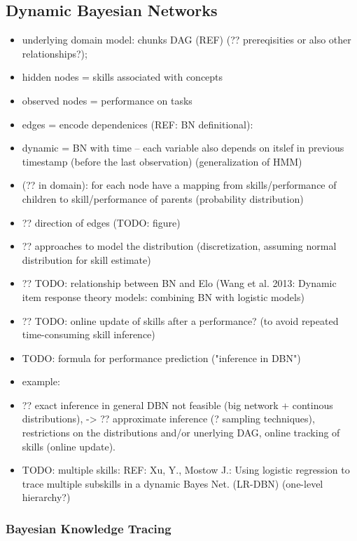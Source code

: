 \subsection{Dynamic Bayesian Networks}

\begin{itemize}
\item underlying domain model: chunks DAG (REF)
  (?? prereqisities or also other relationships?);
\item hidden nodes = skills associated with concepts
\item observed nodes = performance on tasks
\item edges = encode dependenices (REF: BN definitional):
\item dynamic = BN with time -- each variable also depends on itslef in previous timestamp
  (before the last observation) (generalization of HMM)
\item (?? in domain): for each node have a mapping from skills/performance of children
  to skill/performance of parents (probability distribution)
\item ?? direction of edges (TODO: figure)
\item ?? approaches to model the distribution
  (discretization, assuming normal distribution for skill estimate)
\item ?? TODO: relationship between BN and Elo
  (Wang et al. 2013: Dynamic item response theory models: combining BN with logistic models)
\item ?? TODO: online update of skills after a performance?
  (to avoid repeated time-consuming skill inference)
\item TODO: formula for performance prediction ("inference in DBN")
\item example: \cite{its-programming}
\item ?? exact inference in general DBN not feasible (big network + continous distributions),
  -> ?? approximate inference (? sampling techniques),
  restrictions on the distributions and/or unerlying DAG,
  online tracking of skills (online update).
\item TODO: multiple skills: REF: Xu, Y., Mostow J.: Using logistic regression to trace multiple subskills in a dynamic Bayes Net. (LR-DBN) \cite{bn-logreg} (one-level hierarchy?)
\end{itemize}


\subsubsection{Bayesian Knowledge Tracing}
\label{sec:bkt}

